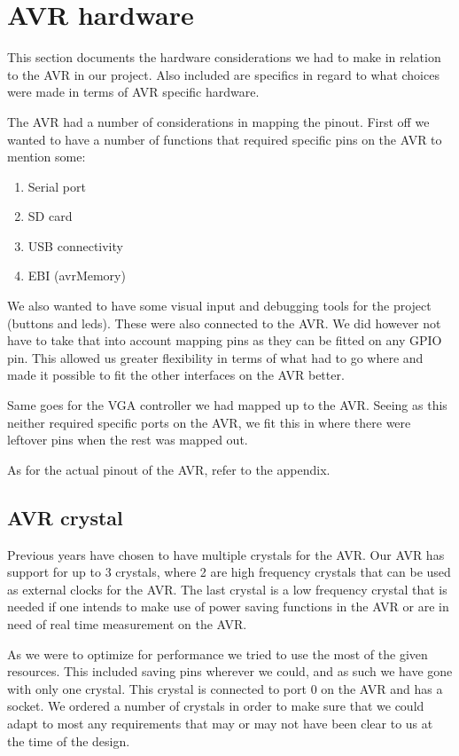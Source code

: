 \section{AVR hardware}

This section documents the hardware considerations we had to make in relation to
the AVR in our project. Also included are specifics in regard to what choices
were made in terms of AVR specific hardware.

The AVR had a number of considerations in mapping the pinout. First off we
wanted to have a number of functions that required specific pins on the AVR to
mention some:

\begin{enumerate}
\item Serial port
\item \ac{SD} card
\item \ac{USB} connectivity
\item \ac{EBI} (avrMemory)
\end{enumerate}

We also wanted to have some visual input and debugging tools for the project
(buttons and leds). These were also connected to the AVR. We did however not
have to take that into account mapping pins as they can be fitted on any
\ac{GPIO} pin. This allowed us greater flexibility in terms of what had to go
where and made it possible to fit the other interfaces on the AVR better.

Same goes for the \ac{VGA} controller we had mapped up to the AVR. Seeing
as this neither required specific ports on the AVR, we fit this in where
there were leftover pins when the rest was mapped out.

As for the actual pinout of the AVR, refer to the appendix.

\subsection{AVR crystal}

Previous years have chosen to have multiple crystals for the AVR. Our AVR has support for up to 3 crystals, where 2 are high frequency crystals that can be used as external clocks for the AVR. The last crystal is a low frequency crystal that is needed if one intends to make use of power saving functions in the AVR or are in need of real time measurement on the AVR. 

As we were to optimize for performance we tried to use the most of the given resources. This included saving pins wherever we could, and as such we have gone with only one crystal. This crystal is connected to port 0 on the AVR and has a socket. We ordered a number of crystals in order to make sure that we could adapt to most any requirements that may or may not have been clear to us at the time of the design.

